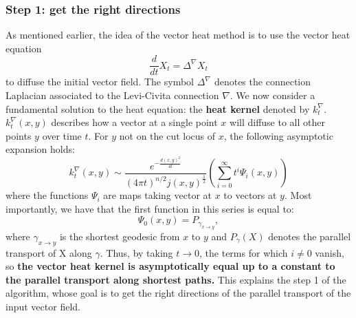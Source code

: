 \documentclass[sigconf]{acmart}
\begin{document}
\subsubsection{Step 1: get the right directions}
As mentioned earlier, the idea of the vector heat method is to use the vector heat equation 
\begin{equation} \label{eq:vector-heat}
  \frac{d}{dt} X_t = \Delta^\nabla X_t
  \end{equation}
to diffuse the initial vector field. The symbol $\Delta^\nabla$ denotes the connection Laplacian associated to the Levi-Civita connection $\nabla$. 
We now consider a fundamental solution to the heat equation: the \textbf{heat kernel} denoted by $k_t^\nabla$. $k_t^\nabla(x,y)$ describes how 
a vector at a single point $x$ will diffuse to all other points $y$ over time $t$. For $y$ not on the cut locus of $x$, the following asymptotic
expansion holds:
\begin{equation} \label{eq:asymptotic_expansion}
  k_t^\nabla(x, y) \sim \frac{e^{-\frac{d(x, y)^2}{4t}}}{(4 \pi t)^{n/2} j(x, y)^\frac{1}{2}} 
\left( \sum_{i=0}^{\infty} t^i \Psi_i(x, y) \right)
  \end{equation}
where the functions $\Psi_i$ are maps taking vector at $x$ to vectors at $y$. Most importantly, we have that the first function in this series 
is equal to:
$$\Psi_0(x,y) = P_{\gamma_{x\rightarrow y}}, $$ where $\gamma_{x \rightarrow y}$ is the shortest geodesic from $x$ to $y$ and $P_\gamma(X)$
denotes the parallel transport of X along $\gamma$. Thus, by taking $t\rightarrow 0$, the terms for which $i\neq 0$ vanish, so \textbf{the vector heat 
kernel is asymptotically equal up to a constant to the parallel transport along shortest paths.} This explains the step 1 of the algorithm, whose goal 
is to get the right directions of the parallel transport of the input vector field.
\end{document}
